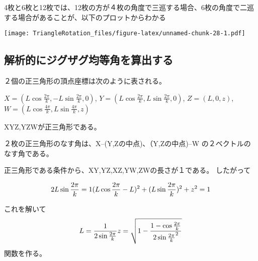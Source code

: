 \documentclass[]{article}
\newenvironment{Shaded}{\begin{snugshade}}{\end{snugshade}}
\newcommand{\KeywordTok}[1]{\textcolor[rgb]{0.13,0.29,0.53}{\textbf{#1}}}
\newcommand{\DataTypeTok}[1]{\textcolor[rgb]{0.13,0.29,0.53}{#1}}
\newcommand{\DecValTok}[1]{\textcolor[rgb]{0.00,0.00,0.81}{#1}}
\newcommand{\StringTok}[1]{\textcolor[rgb]{0.31,0.60,0.02}{#1}}
\newcommand{\OperatorTok}[1]{\textcolor[rgb]{0.81,0.36,0.00}{\textbf{#1}}}
\newcommand{\NormalTok}[1]{#1}
\begin{document}
4枚と6枚と12枚では、12枚の方が４枚の角度で三巡する場合、6枚の角度で二巡する場合があることが、以下のプロットからわかる

\begin{Shaded}
\end{Shaded}

\texttt{[image: TriangleRotation\_files/figure-latex/unnamed-chunk-28-1.pdf]}

\subsection{解析的にジグザグ均等角を算出する}\label{ux89e3ux6790ux7684ux306bux30b8ux30b0ux30b6ux30b0ux5747ux7b49ux89d2ux3092ux7b97ux51faux3059ux308b}

２個の正三角形の頂点座標は次のように表される。

\(X = (L\cos{\frac{2\pi}{k}},-L\sin{\frac{2\pi}{k}},0)\),
\(Y = (L\cos{\frac{2\pi}{k}},L\sin{\frac{2\pi}{k}},0)\),
\(Z = (L,0,z)\), \(W = (L\cos{\frac{4\pi}{k}},L\sin{\frac{4\pi}{k}},z)\)

XYZ,YZWが正三角形である。

２枚の正三角形のなす角は、X--(Y,Zの中点)、（Y,Zの中点)--W
の２ベクトルのなす角である。

正三角形である条件から、XY,YZ,XZ,YW,ZWの長さが１である。 したがって

\[
2L\sin{\frac{2\pi}{k}} = 1\\
(L\cos{\frac{2\pi}{k}} - L)^2 + (L\sin{\frac{2\pi}{k}})^2 + z^ 2=1
\]

これを解いて \[
L = \frac{1}{2\sin{\frac{2\pi}{k}}}\\
z = \sqrt{1-\frac{1-\cos{\frac{2\pi}{k}}}{2\sin{\frac{2\pi}{k}}^2}}
\] 関数を作る。
\end{document}
